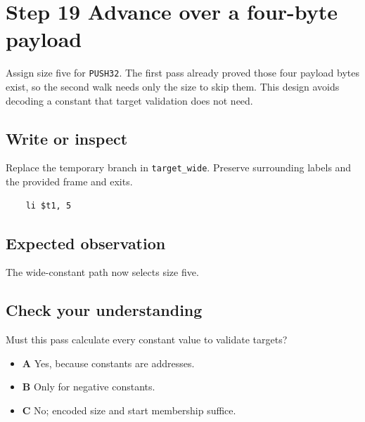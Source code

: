 \section{Step 19 Advance over a four-byte payload}\label{vm-s19}

Assign size five for \texttt{PUSH32}. The first pass already proved those four payload bytes exist, so the second walk needs only the size to skip them. This design avoids decoding a constant that target validation does not need.

\subsection{Write or inspect}
Replace the temporary branch in \texttt{target\_wide}. Preserve surrounding labels and the provided frame and exits.

\begin{verbatim}
    li $t1, 5
\end{verbatim}
\subsection{Expected observation}
The wide-constant path now selects size five.

\subsection{Check your understanding}
Must this pass calculate every constant value to validate targets?

\begin{itemize}
  \item \textbf{A} Yes, because constants are addresses.
  \item \textbf{B} Only for negative constants.
  \item \textbf{C} No; encoded size and start membership suffice.
\end{itemize}
